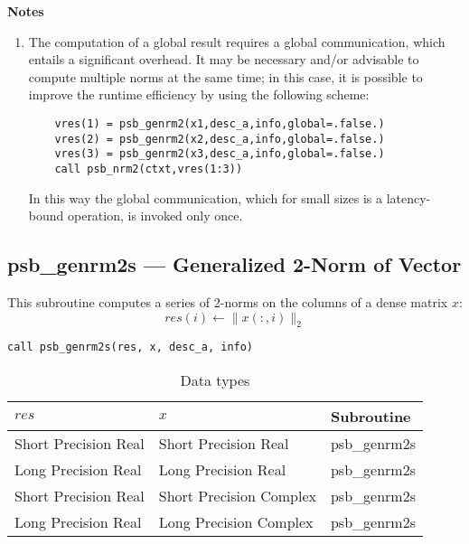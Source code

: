 {\par\noindent\large\bfseries Notes}
\begin{enumerate}
\item The computation of a global result requires a global
  communication, which entails a significant overhead. It may be
  necessary and/or advisable to compute multiple norms at the same 
  time; in this case, it is possible to improve the runtime efficiency
  by using the following scheme:
  \begin{lstlisting}
    vres(1) = psb_genrm2(x1,desc_a,info,global=.false.)
    vres(2) = psb_genrm2(x2,desc_a,info,global=.false.)
    vres(3) = psb_genrm2(x3,desc_a,info,global=.false.)
    call psb_nrm2(ctxt,vres(1:3))
  \end{lstlisting}
  In this way the global communication, which for small sizes is a
  latency-bound operation, is invoked only once.
\end{enumerate}



\clearpage\subsection{psb\_genrm2s --- Generalized 2-Norm of Vector}

This subroutine computes a series of  2-norms on the columns of
a  dense matrix  $x$: 
\[ res(i) \leftarrow \|x(:,i)\|_2 \]


\begin{verbatim}
call psb_genrm2s(res, x, desc_a, info)
\end{verbatim}

\begin{table}[h]
\begin{center}
\begin{tabular}{lll}
\hline
$res$ & $x$ & {\bf Subroutine}\\
\hline
Short Precision Real&Short Precision Real & psb\_genrm2s \\
Long Precision Real&Long Precision Real & psb\_genrm2s \\
Short Precision Real&Short Precision Complex & psb\_genrm2s \\
Long Precision Real&Long Precision Complex & psb\_genrm2s \\
\hline
\end{tabular}
\end{center}
\caption{Data types\label{tab:f90nrm2s}}
\end{table}

